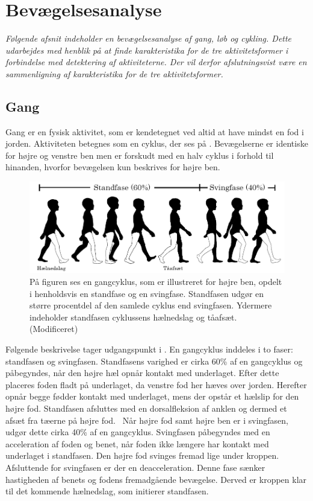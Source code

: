 \section{Bevægelsesanalyse} \label{bevaegelse}
\textit{Følgende afsnit indeholder en bevægelsesanalyse af gang, løb og cykling. Dette udarbejdes med henblik på at finde karakteristika for de tre aktivitetsformer i forbindelse med detektering af aktiviteterne. Der vil derfor afslutningsvist være en sammenligning af karakteristika for de tre aktivitetsformer.}

\subsection{Gang}
Gang er en fysisk aktivitet, som er kendetegnet ved altid at have mindst en fod i jorden. Aktiviteten betegnes som en cyklus, der ses på . Bevægelserne er identiske for højre og venstre ben men er forskudt med en halv cyklus i forhold til hinanden, hvorfor bevægelsen kun beskrives for højre ben.~\citep{VaughanDavisOConnor1992,Whittle1990} 
\begin{figure}[H]
	\centering
	\includegraphics[scale=0.7]{figures/bProblemloesning/gang_cyklus.png}
	\caption{På figuren ses en gangcyklus, som er illustreret for højre ben, opdelt i henholdsvis en standfase og en svingfase. Standfasen udgør en større procentdel af den samlede cyklus end svingfasen. Ydermere indeholder standfasen cyklussens hælnedslag og tåafsæt.~\citep{VaughanDavisOConnor1992} (Modificeret)}
	\label{fig:gang_cyklus}
\end{figure}\vspace{-0.25cm}
Følgende beskrivelse tager udgangspunkt i . En gangcyklus inddeles i to faser: standfasen og svingfasen. Standfasens varighed er cirka 60\% af en gangcyklus og påbegyndes, når den højre hæl opnår kontakt med underlaget. Efter dette placeres foden fladt på underlaget, da venstre fod her hæves over jorden. Herefter opnår begge fødder kontakt med underlaget, mens der opstår et hælslip for den højre fod. Standfasen afsluttes med en dorsalfleksion af anklen og dermed et afsæt fra tæerne på højre fod.~\citep{VaughanDavisOConnor1992,Whittle1990}  \newline 
Når højre fod samt højre ben er i svingfasen, udgør dette cirka 40\% af en gangcyklus. Svingfasen påbegyndes med en acceleration af foden og benet, når foden ikke længere har kontakt med underlaget i standfasen. Den højre fod svinges fremad lige under kroppen. Afsluttende for svingfasen er der en deacceleration. Denne fase sænker hastigheden af benets og fodens fremadgående bevægelse. Derved er kroppen klar til det kommende hælnedslag, som initierer standfasen.~\citep{VaughanDavisOConnor1992,Whittle1990}

